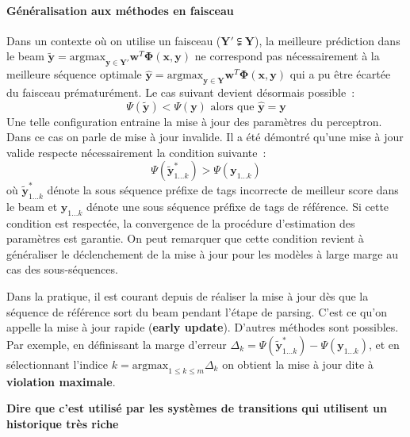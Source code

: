 \documentclass[11pt,openany]{book}
\newcommand{\kw}[1]{{\bf #1}} %
\begin{document}
\paragraph{Généralisation aux méthodes en faisceau}
Dans un contexte où on utilise un faisceau ($\mathbf{Y}' \subsetneqq \mathbf{Y}$), la meilleure prédiction dans le
beam $\tilde{\mathbf{y}} = \text{argmax}_{\mathbf{y} \in \mathbf{Y'}}
\mathbf{w}^T \boldsymbol\Phi(\mathbf{x},\mathbf{y})$ ne correspond pas nécessairement à
la meilleure séquence optimale $\hat{\mathbf{y}} = \text{argmax}_{\mathbf{y} \in \mathbf{Y}}
\mathbf{w}^T \boldsymbol\Phi(\mathbf{x},\mathbf{y})$ qui a pu être écartée du faisceau prématurément.  
Le cas suivant devient désormais possible~:
\begin{displaymath}
\Psi(\tilde{\mathbf{y}}) < \Psi(\mathbf{y}) \text{ alors que } \hat{\mathbf{y}} = \mathbf{y}
\end{displaymath}
Une telle configuration entraine la mise à jour des paramètres du perceptron. Dans
ce cas on parle de mise à jour invalide. Il a été démontré
\cite{huang-2012} qu'une mise à jour valide respecte nécessairement la
condition suivante~: 
\begin{displaymath}
\Psi(\tilde{\mathbf{y}}_{1\ldots k}^*) > \Psi(\mathbf{y}_{1\ldots k})
\end{displaymath}
où $\tilde{\mathbf{y}}_{1\ldots k}^*$ dénote la sous séquence préfixe
de tags incorrecte de meilleur score dans le beam et  $\mathbf{y}_{1\ldots k}$
dénote une sous séquence préfixe de tags de référence.
Si cette condition est respectée, la convergence de la procédure d'estimation des paramètres
est garantie. On peut remarquer que cette condition revient à
généraliser le déclenchement de la mise à jour pour les modèles à
large marge au cas des sous-séquences.

Dans la pratique, il est courant depuis \cite{collins-2004} 
de réaliser la mise à jour dès que la séquence de référence sort du
beam pendant l'étape de parsing.
C'est ce qu'on appelle la mise à jour rapide (\kw{early update}).
D'autres méthodes sont possibles. Par exemple, en définissant la marge d'erreur
$\Delta_k =  \Psi(\tilde{\mathbf{y}}_{1\ldots k}^*) -
\Psi(\mathbf{y}_{1\ldots k})$, et en sélectionnant l'indice $k =
\text{argmax}_{1\leq k \leq m} \Delta_k$ on obtient la mise à jour
dite à \kw{violation maximale}. 

{\bf Dire que c'est utilisé par les systèmes de transitions qui
  utilisent un historique très riche}
\end{document}
